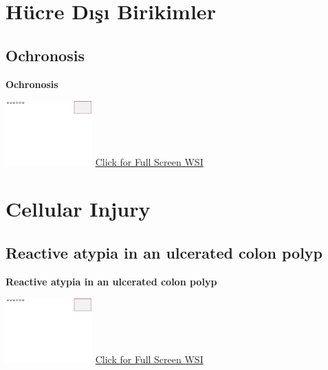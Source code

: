 \documentclass[
  letterpaper,
  paper=6in:9in,
  pagesize=pdftex,
  headinclude=on,
  footinclude=on,
  12pt]{scrbook}
\begin{document}
\hypertarget{sec-hucre-disi-birikimler}{%
\chapter{Hücre Dışı Birikimler}\label{sec-hucre-disi-birikimler}}

\hypertarget{sec-ochronosis}{%
\section{Ochronosis}\label{sec-ochronosis}}

\textbf{Ochronosis}

\href{https://images.patolojiatlasi.com/template/HE.html}{\includegraphics[width=0.25\textwidth,height=\textheight]{./screenshots/template_screenshot.png}}
\href{https://images.patolojiatlasi.com/ochronosis/HE.html}{Click for
Full Screen WSI}

\hypertarget{sec-cellular-injury}{%
\chapter{Cellular Injury}\label{sec-cellular-injury}}

\hypertarget{sec-reactive-atypia}{%
\section{Reactive atypia in an ulcerated colon
polyp}\label{sec-reactive-atypia}}

\textbf{Reactive atypia in an ulcerated colon polyp}

\href{https://images.patolojiatlasi.com/template/HE.html}{\includegraphics[width=0.25\textwidth,height=\textheight]{./screenshots/template_screenshot.png}}
\href{https://images.patolojiatlasi.com/reactive-atypia/HE.html}{Click
for Full Screen WSI}

\hypertarget{section-1}{%
\chapter{}\label{section-1}}
\end{document}
